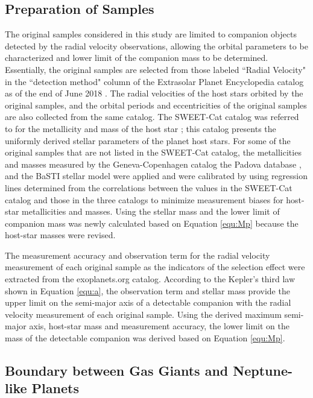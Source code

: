 \documentclass[twocolumn, dvipdfmx]{aastex62}
\begin{document}
\begin{CJK*}{UTF8}{min}
\subsection{Preparation of Samples} \label{subsec:preparation}

The original samples considered in this study are limited to companion objects detected by the radial velocity observations, allowing the orbital parameters to be characterized and lower limit of the companion mass to be determined. Essentially, the original samples are selected from those labeled ``Radial Velocity" in the ``detection method" column of the Extrasolar Planet Encyclopedia catalog as of the end of June 2018 \citep{2011A&A...532A..79S}. The radial velocities of the host stars orbited by the original samples, and the orbital periods and eccentricities of the original samples are also collected from the same catalog. The SWEET-Cat catalog was referred to for the metallicity and mass of the host star \citep{2013A&A...556A.150S, 2018A&A...620A..58S}; this catalog presents the uniformly derived stellar parameters of the planet host stars. For some of the original samples that are not listed in the SWEET-Cat catalog, the metallicities and masses measured by the Geneva-Copenhagen catalog \citep{2011A&A...530A.138C} the Padova database \citep{2000A&AS..141..371G}, and the BaSTI stellar model \citep{2018ApJ...856..125H} were applied and were calibrated by using regression lines determined from the correlations between the values in the SWEET-Cat catalog and those in the three catalogs to minimize measurement biases for host-star metallicities and masses. Using the stellar mass and the lower limit of companion mass was newly calculated based on Equation \ref{equ:Mp} because the host-star masses were revised.

The measurement accuracy and observation term for the radial velocity measurement of each original sample as the indicators of the selection effect were extracted from the exoplanets.org catalog. According to the Kepler’s third law shown in Equation \ref{equ:a}, the observation term and stellar mass provide the upper limit on the semi-major axis of a detectable companion with the radial velocity measurement of each original sample. Using the derived maximum semi-major axis, host-star mass and measurement accuracy, the lower limit on the mass of the detectable companion was derived based on Equation \ref{equ:Mp}.


\subsection{Boundary between Gas Giants and Neptune-like Planets} \label{subsec:boundary}


\end{CJK*}
\end{document}
